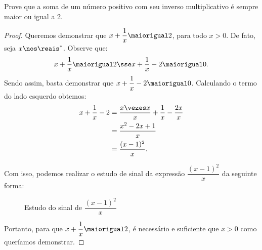 \begin{example}
    Prove que a soma de um número positivo com seu inverso multiplicativo é sempre maior ou igual a 2.
\end{example}

\begin{proof}
    Queremos demonstrar que $x + \dfrac 1 x \maiorigual 2$, para todo $x > 0$. De fato, seja $x \nos \reais^\ast$. Observe que:
    \[
        x + \dfrac 1 x \maiorigual 2 \sse x + \dfrac 1 x - 2 \maiorigual 0.
    \]
    Sendo assim, basta demonstrar que $x + \dfrac 1 x - 2 \maiorigual 0$. Calculando o termo do lado esquerdo obtemos:
    \begin{align*}
        x + \dfrac 1 x - 2 &= \dfrac {x \vezes x} x + \dfrac 1 x -  \dfrac {2x} x \\
                           &= \dfrac {x^2 - 2x + 1} x \\
                           &= \dfrac {(x - 1)^2} x.
    \end{align*}

    Com isso, podemos realizar o estudo de sinal da expressão $\dfrac {(x - 1)^2} x$ da seguinte forma:
    \begin{figure}[H]
        \centering
        \caption{Estudo do sinal de $\dfrac {(x-1)^2} x$}
    \end{figure}

    Portanto, para que $x + \dfrac 1 x \maiorigual 2$, é necessário e suficiente que $x > 0$ como queríamos demonstrar.
\end{proof}